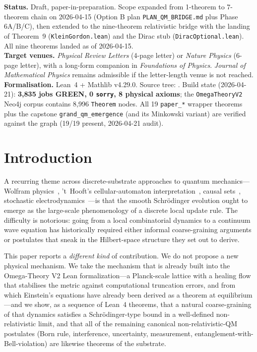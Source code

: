 \documentclass[11pt,a4paper,twoside]{article}
\theoremstyle{definition}
\newcommand{\code}[1]{\texttt{#1}}
\begin{document}
\noindent\textbf{Status.} Draft, paper-in-preparation. Scope expanded
from 1-theorem to 7-theorem chain on 2026-04-15 (Option B plan
\code{PLAN\_QM\_BRIDGE.md} plus Phase 6A/B/C), then extended to the
nine-theorem relativistic bridge with the landing of Theorem~9
(\code{KleinGordon.lean}) and the Dirac stub
(\code{DiracOptional.lean}). All nine theorems landed as of
2026-04-15.\\
\textbf{Target venues.} \emph{Physical Review Letters} (4-page letter) or
\emph{Nature Physics} (6-page letter), with a long-form companion in
\emph{Foundations of Physics}. \emph{Journal of Mathematical Physics}
remains admissible if the letter-length venue is not reached.\\
\textbf{Formalisation.} Lean~4 + Mathlib v4.29.0. Source tree:
. Build state (2026-04-21):
\textbf{3{,}835 jobs GREEN, 0 \code{sorry}, 8 physical axioms}; the
\code{OmegaTheoryV2} Neo4j corpus contains 8{,}996 \code{Theorem} nodes.
All 19 \code{paper\_*} wrapper theorems plus the capstone
\code{grand\_qm\_emergence} (and its Minkowski variant) are verified
against the graph (19/19 present, 2026-04-21 audit).

\tableofcontents

\section{Introduction}\label{sec:intro}

A recurring theme across discrete-substrate approaches to quantum
mechanics---Wolfram physics~\cite{Wolfram2020}, 't~Hooft's
cellular-automaton interpretation~\cite{tHooft2014,tHooft2016}, causal
sets~\cite{BombelliLeeMeyerSorkin1987}, stochastic
electrodynamics~\cite{dePenaCetto1996}---is that the smooth Schr\"odinger
evolution ought to emerge as the large-scale phenomenology of a discrete
local update rule. The difficulty is notorious: going from a local
combinatorial dynamics to a continuum wave equation has historically
required either informal coarse-graining arguments or postulates that
sneak in the Hilbert-space structure they set out to derive.

This paper reports a \emph{different kind} of contribution. We do not
propose a new physical mechanism. We take the mechanism that is already
built into the Omega-Theory V2 Lean formalization---a Planck-scale
lattice with a healing flow that stabilises the metric against
computational truncation errors, and from which Einstein's equations
have already been derived as a theorem at equilibrium---and we show, as
a sequence of Lean~4 theorems, that a natural coarse-graining of that
dynamics satisfies a Schr\"odinger-type bound in a well-defined
non-relativistic limit, and that all of the remaining canonical
non-relativistic-QM postulates (Born rule, interference, uncertainty,
measurement, entanglement-with-Bell-violation) are likewise theorems of
the substrate.
\end{document}
